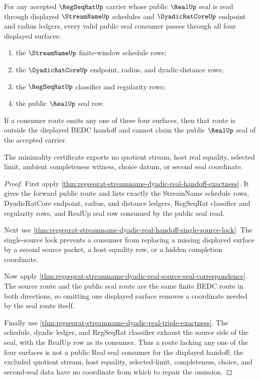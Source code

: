 \begin{theorem}
\label{thm:regseqrat-streamname-dyadic-real-four-stage-consumer-minimality}
For any accepted $\RegSeqRatUp$ carrier whose public $\RealUp$ seal is read
through displayed $\StreamNameUp$ schedules and $\DyadicRatCoreUp$ endpoint and
radius ledgers, every valid public seal consumer passes through all four
displayed surfaces:
\begin{enumerate}
\item the $\StreamNameUp$ finite-window schedule rows;
\item the $\DyadicRatCoreUp$ endpoint, radius, and dyadic-distance rows;
\item the $\RegSeqRatUp$ classifier and regularity rows;
\item the public $\RealUp$ seal row.
\end{enumerate}
If a consumer route omits any one of these four surfaces, then that route is
outside the displayed BEDC handoff and cannot claim the public $\RealUp$ seal
of the accepted carrier.

The minimality certificate exports no quotient stream, host real equality,
selected limit, ambient completeness witness, choice datum, or second seal
coordinate.
\end{theorem}
\begin{proof}
First apply
\autoref{thm:regseqrat-streamname-dyadic-real-handoff-exactness}. It gives the
forward public route and lists exactly the StreamName schedule rows,
DyadicRatCore endpoint, radius, and distance ledgers, RegSeqRat classifier and
regularity rows, and RealUp seal row consumed by the public seal read.

Next use
\autoref{thm:regseqrat-streamname-dyadic-real-handoff-single-source-lock}. The
single-source lock prevents a consumer from replacing a missing displayed
surface by a second source packet, a host equality row, or a hidden completion
coordinate.

Now apply
\autoref{thm:regseqrat-streamname-dyadic-real-source-seal-correspondence}. The
source route and the public seal route are the same finite BEDC route in both
directions, so omitting one displayed surface removes a coordinate needed by
the seal route itself.

Finally use
\autoref{thm:regseqrat-streamname-dyadic-real-triple-exactness}. The schedule,
dyadic ledger, and RegSeqRat classifier exhaust the source side of the seal,
with the RealUp row as its consumer. Thus a route lacking any one of the four
surfaces is not a public Real seal consumer for the displayed handoff; the
excluded quotient stream, host equality, selected-limit, completeness, choice,
and second-seal data have no coordinate from which to repair the omission.
\end{proof}

